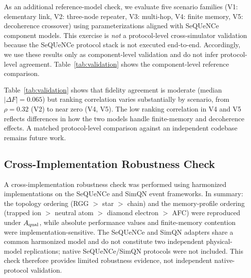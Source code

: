 \documentclass[quantumrep,article,submit,moreauthors]{Definitions/mdpi}
\begin{document}
As an additional reference-model check, we evaluate five scenario families (V1: elementary link, V2: three-node repeater, V3: multi-hop, V4: finite memory, V5: decoherence crossover) using parameterizations aligned with SeQUeNCe component models. This exercise is \emph{not} a protocol-level cross-simulator validation because the SeQUeNCe protocol stack is not executed end-to-end. Accordingly, we use these results only as component-level validation and do not infer protocol-level agreement. Table~\ref{tab:validation} shows the component-level reference comparison.

\begin{table}[htbp]
\centering
\caption{Component-level reference comparison per scenario. $\rho$ is the Spearman rank correlation between WestQuant and reference-model $A_{\rm req}$.}
\label{tab:validation}
\end{table}

Table~\ref{tab:validation} shows that fidelity agreement is moderate (median $|\Delta F| = 0.065$) but ranking correlation varies substantially by scenario, from $\rho = 0.32$ (V2) to near zero (V4, V5). The low ranking correlation in V4 and V5 reflects differences in how the two models handle finite-memory and decoherence effects. A matched protocol-level comparison against an independent codebase remains future work.

\subsection{Cross-Implementation Robustness Check}
\label{sec:cross_impl}

A cross-implementation robustness check was performed using harmonized implementations on the SeQUeNCe and SimQN event frameworks. In summary: the topology ordering (RGG $>$ star $>$ chain) and the memory-profile ordering (trapped ion $>$ neutral atom $>$ diamond electron $>$ AFC) were reproduced under $A_{\rm qual}$, while absolute performance values and finite-memory contention were implementation-sensitive. The SeQUeNCe and SimQN adapters share a common harmonized model and do not constitute two independent physical-model replications; native SeQUeNCe/SimQN protocols were not included. This check therefore provides limited robustness evidence, not independent native-protocol validation.
\end{document}
